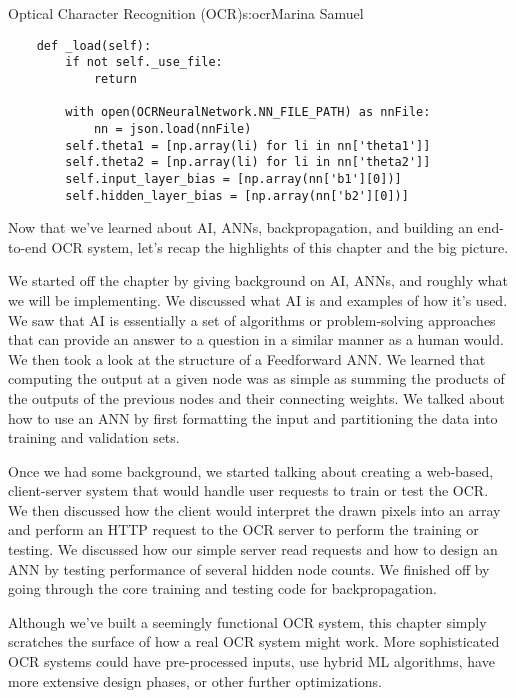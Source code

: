 \begin{aosachapter}{Optical Character Recognition (OCR)}{s:ocr}{Marina Samuel}
\begin{verbatim}
    def _load(self):
        if not self._use_file:
            return

        with open(OCRNeuralNetwork.NN_FILE_PATH) as nnFile:
            nn = json.load(nnFile)
        self.theta1 = [np.array(li) for li in nn['theta1']]
        self.theta2 = [np.array(li) for li in nn['theta2']]
        self.input_layer_bias = [np.array(nn['b1'][0])]
        self.hidden_layer_bias = [np.array(nn['b2'][0])]
\end{verbatim}

\label{conclusion}

Now that we've learned about AI, ANNs, backpropagation, and building an
end-to-end OCR system, let's recap the highlights of this chapter and
the big picture.

We started off the chapter by giving background on AI, ANNs, and roughly
what we will be implementing. We discussed what AI is and examples of
how it's used. We saw that AI is essentially a set of algorithms or
problem-solving approaches that can provide an answer to a question in a
similar manner as a human would. We then took a look at the structure of
a Feedforward ANN. We learned that computing the output at a given node
was as simple as summing the products of the outputs of the previous
nodes and their connecting weights. We talked about how to use an ANN by
first formatting the input and partitioning the data into training and
validation sets.

Once we had some background, we started talking about creating a
web-based, client-server system that would handle user requests to train
or test the OCR. We then discussed how the client would interpret the
drawn pixels into an array and perform an HTTP request to the OCR server
to perform the training or testing. We discussed how our simple server
read requests and how to design an ANN by testing performance of several
hidden node counts. We finished off by going through the core training
and testing code for backpropagation.

Although we've built a seemingly functional OCR system, this chapter
simply scratches the surface of how a real OCR system might work. More
sophisticated OCR systems could have pre-processed inputs, use hybrid ML
algorithms, have more extensive design phases, or other further
optimizations.

\end{aosachapter}
